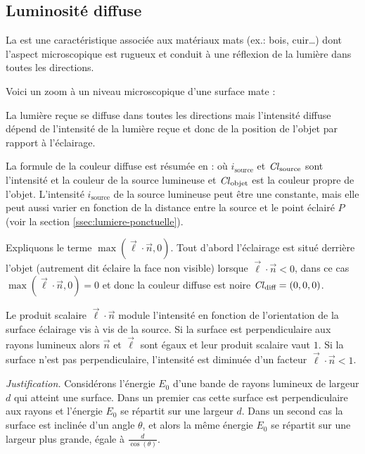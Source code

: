 \documentclass[11pt,class=report,crop=false]{standalone}
\begin{document}
\subsection{Luminosité diffuse}



La  est une caractéristique associée aux matériaux mats (ex.: bois, cuir\ldots) dont l'aspect microscopique est rugueux et conduit à une réflexion de la lumière dans toutes les directions.

Voici un zoom à un niveau microscopique d'une surface mate :

La lumière reçue se diffuse dans toutes les directions mais l'intensité diffuse dépend de l'intensité de la lumière reçue et donc de la position de l'objet par rapport à l'éclairage.




La formule de la couleur diffuse est résumée en :
où $i_{\text{source}}$ et $\operatorname{\it Cl}_{\text{source}}$ sont l'intensité et la couleur de la source lumineuse et $\operatorname{\it Cl}_{\text{objet}}$ est la couleur propre de l'objet.
L'intensité $i_{\text{source}}$ de la source lumineuse peut être une constante, mais elle peut aussi varier en fonction de la distance entre la source et le point éclairé $P$ (voir la section \ref{ssec:lumiere-ponctuelle}).

Expliquons le terme $\max(\vec\ell\cdot\vec n,0)$. Tout d'abord l'éclairage est situé derrière l'objet (autrement dit éclaire la face non visible) lorsque $\vec\ell\cdot\vec n < 0$, dans ce cas $\max(\vec\ell\cdot\vec n,0)=0$ et donc la couleur diffuse est noire $\operatorname{\it Cl}_{\text{diff}} = (0,0,0)$.

Le produit scalaire $\vec\ell\cdot\vec n$ module l'intensité en fonction de l'orientation de la surface éclairage vis à vis de la source.
Si la surface est perpendiculaire aux rayons lumineux alors $\vec n$ et $\vec \ell$ sont égaux et leur produit scalaire vaut 
$1$. Si la surface n'est pas perpendiculaire, l'intensité est diminuée d'un facteur $\vec\ell\cdot\vec n < 1$.

\medskip

\emph{Justification.}
Considérons l'énergie $E_0$ d'une bande de rayons lumineux de largeur $d$ qui atteint une surface. Dans un premier cas cette surface est perpendiculaire aux rayons et l'énergie $E_0$ se répartit sur une largeur $d$. Dans un second cas la surface est inclinée d'un angle $\theta$, et alors la même énergie $E_0$ se répartit sur une largeur plus grande, égale à $\frac{d}{\cos(\theta)}$.
\end{document}
